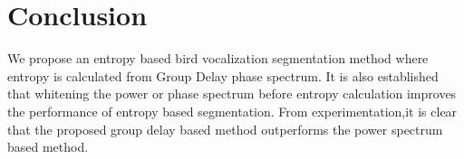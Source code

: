\documentclass[a4paper]{article}
\begin{document}

 
 
\section{Conclusion}
We propose an entropy based bird vocalization segmentation method where entropy is calculated from Group Delay phase spectrum. It is also established that whitening the power or phase spectrum before entropy calculation improves the performance of entropy based segmentation. From experimentation,it is clear that the proposed group delay based method outperforms the power spectrum based method.  



  \newpage
  \eightpt
  

  

\end{document}
